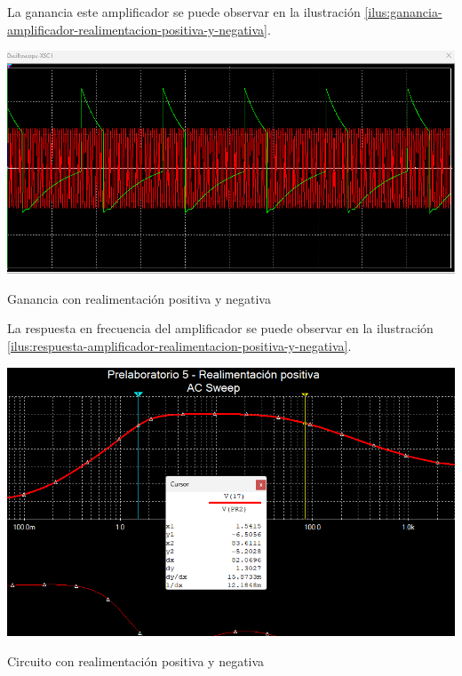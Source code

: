 \documentclass{article}
\begin{document}
La ganancia este amplificador se puede observar en la ilustración \ref{ilus:ganancia-amplificador-realimentacion-positiva-y-negativa}.
\begin{ilustracion}[ht]
    \centering
    \includegraphics[width=\textwidth]{src/images/Prelaboratorio 5 - Ganancia realimentacion positiva con condensador.png}
    \caption{Ganancia con realimentación positiva y negativa} 
    \label{ilus:ganancia-amplificador-realimentacion-positiva-y-negativa}
\end{ilustracion}

La respuesta en frecuencia del amplificador se puede observar en la ilustración \ref{ilus:respuesta-amplificador-realimentacion-positiva-y-negativa}.

\begin{ilustracion}[ht]
    \centering
    \includegraphics[width=\textwidth]{src/images/Prelaboratorio 5 - Respuesta en frecuencia - realimentacion positiva con condensador.png}
    \caption{Circuito con realimentación positiva y negativa} 
    \label{ilus:respuesta-amplificador-realimentacion-positiva-y-negativa}
\end{ilustracion}
\end{document}
